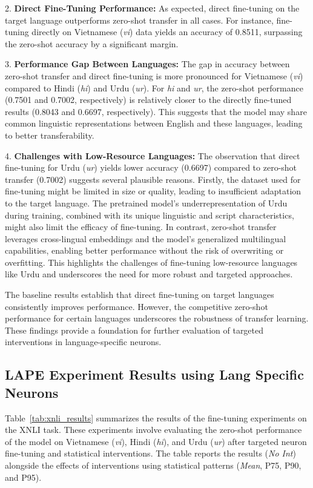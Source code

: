 2. \textbf{Direct Fine-Tuning Performance:}
As expected, direct fine-tuning on the target language outperforms zero-shot transfer in all cases. For instance, fine-tuning directly on Vietnamese (\textit{vi}) data yields an accuracy of 0.8511, surpassing the zero-shot accuracy by a significant margin.

3. \textbf{Performance Gap Between Languages:}
The gap in accuracy between zero-shot transfer and direct fine-tuning is more pronounced for Vietnamese (\textit{vi}) compared to Hindi (\textit{hi}) and Urdu (\textit{ur}). For \textit{hi} and \textit{ur}, the zero-shot performance (0.7501 and 0.7002, respectively) is relatively closer to the directly fine-tuned results (0.8043 and 0.6697, respectively). This suggests that the model may share common linguistic representations between English and these languages, leading to better transferability.

4. \textbf{Challenges with Low-Resource Languages:}
The observation that direct fine-tuning for Urdu (\textit{ur}) yields lower accuracy (0.6697) compared to zero-shot transfer (0.7002) suggests several plausible reasons. Firstly, the dataset used for fine-tuning might be limited in size or quality, leading to insufficient adaptation to the target language. The pretrained model's underrepresentation of Urdu during training, combined with its unique linguistic and script characteristics, might also limit the efficacy of fine-tuning. In contrast, zero-shot transfer leverages cross-lingual embeddings and the model's generalized multilingual capabilities, enabling better performance without the risk of overwriting or overfitting. This highlights the challenges of fine-tuning low-resource languages like Urdu and underscores the need for more robust and targeted approaches. 

The baseline results establish that direct fine-tuning on target languages consistently improves performance. However, the competitive zero-shot performance for certain languages underscores the robustness of transfer learning. These findings provide a foundation for further evaluation of targeted interventions in language-specific neurons.


\subsection{LAPE Experiment Results using Lang Specific Neurons}

Table~\ref{tab:xnli_results} summarizes the results of the fine-tuning experiments on the XNLI task. These experiments involve evaluating the zero-shot performance of the model on Vietnamese (\textit{vi}), Hindi (\textit{hi}), and Urdu (\textit{ur}) after targeted neuron fine-tuning and statistical interventions. The table reports the results (\textit{No Int}) alongside the effects of interventions using statistical patterns (\textit{Mean}, P75, P90, and P95).

